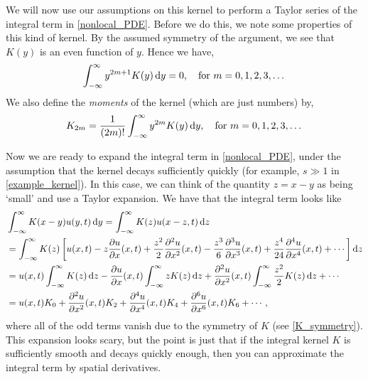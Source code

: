 \documentclass[main.tex]{subfiles}
\begin{document}
We will now use our assumptions on this kernel to perform a Taylor series of the integral term in \cref{nonlocal_PDE}. Before we do this, we note some properties of this kind of kernel. By the assumed symmetry of the argument, we see that $K(y)$ is an even function of $y$. Hence we have,
\begin{equation}\label{K_symmetry}
\int_{-\infty}^{\infty}y^{2m+1}K(y)\,\mathrm{d} y = 0, \quad \text{for } m=0,1,2,3,\dots
\end{equation}
We also define the \emph{moments} of the kernel (which are just numbers) by,
\begin{equation}
K_{2m} = \frac{1}{(2m)!}\int_{-\infty}^{\infty}y^{2m}K(y)\, \mathrm{d} y, \quad \text{for } m=0,1,2,3,\dots
\end{equation}


Now we are ready to expand the integral term in \cref{nonlocal_PDE}, under the assumption that the kernel decays sufficiently quickly (for example, $s \gg 1$ in \cref{example_kernel}). In this case, we can think of the quantity $z = x-y$ as being `small' and use a Taylor expansion. We have that the integral term looks like
\begin{equation}
\begin{aligned}\label{horrific_expansion}
    &\int_{-\infty}^{\infty} K(x-y) u(y,t) \, \d y = \int_{-\infty}^{\infty} K(z) u(x-z,t) \, \d z \\ &=\int_{-\infty}^{\infty} K(z) \left [u(x,t)-z\pd{u}{x}(x,t)+\frac{z^2}{2}\pdd{u}{x}(x,t)-\frac{z^3}{6}\pdn{3}{u}{x}(x,t) + \frac{z^4}{24}\pdn{4}{u}{x}(x,t) +\cdots \right] \d z\\
    &=u(x,t)\int_{-\infty}^{\infty} K(z) \, \d z-\pd{u}{x}(x,t)\int_{-\infty}^{\infty} zK(z) \, \d z +\pdd{u}{x}(x,t)\int_{-\infty}^{\infty} \frac{z^2}{2}K(z) \, \d z+\cdots\\
    &=u(x,t)K_0 +\pdd{u}{x}(x,t)K_2+\pdn{4}{u}{x}(x,t)K_4+\pdn{6}{u}{x}(x,t)K_6+\cdots,
    \end{aligned}
\end{equation}
where all of the odd terms vanish due to the symmetry of $K$ (see \cref{K_symmetry}). This expansion looks scary, but the point is just that if the integral kernel $K$ is sufficiently smooth and decays quickly enough, then you can approximate the integral term by spatial derivatives.
\end{document}
